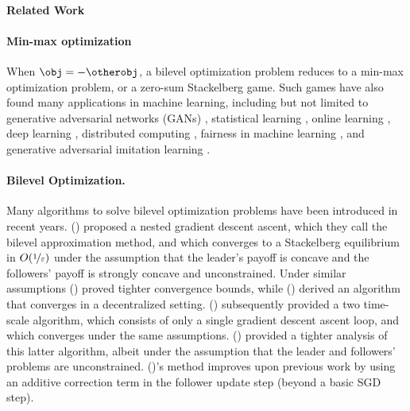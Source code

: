 \paragraph{Related Work}

\paragraph{Min-max optimization}
When $\obj = -\otherobj$, a bilevel optimization problem reduces to a min-max optimization problem, or a zero-sum Stackelberg game. 
Such games have also found many applications in machine learning, including but not limited to generative adversarial networks (GANs) \cite{goodfellow2014gan}, statistical learning \cite{xu2009robustness, shafieezadeh2015distributionally, dai2019kernel}, online learning \cite{cesa2006prediction}, deep learning \cite{sinha2017certifiable, sinha2020certifying}, distributed computing \cite{shamma2008cooperative, mateos2010distributed}, fairness in machine learning \cite{dai2019kernel, edwards2016censoring, madras2018learning, sattigeri2018fairness, xu2018fairgan}, and generative adversarial imitation learning \cite{cai2019global, hamedani2018iteration}.


\paragraph{Bilevel Optimization.} 
Many algorithms to solve bilevel optimization problems have been introduced in recent years.
\citeauthor{ghadimi2018approximation} (\citeyear{ghadimi2018approximation}) proposed a nested gradient descent ascent, which they call the bilevel approximation method, and which converges to a Stackelberg equilibrium in $O(\nicefrac{1}{\varepsilon})$ under the assumption that the leader's payoff is concave and the followers' payoff is strongly concave and unconstrained.
Under similar assumptions \citeauthor{ji2021bilevel} (\citeyear{ji2021bilevel}) proved tighter convergence bounds,
while \citeauthor{yang2021achieving} (\citeyear{yang2021achieving}) derived an
algorithm that converges  
in a decentralized setting.
\citeauthor{hong2020two} (\citeyear{hong2020two}) subsequently provided a two time-scale algorithm, which consists of only a single gradient descent ascent loop, and which converges  under the same assumptions.
\citeauthor{chen2021closing} (\citeyear{chen2021closing}) provided a tighter analysis of this latter algorithm, albeit under the assumption that the leader and followers' problems are unconstrained.
\citeauthor{chen2021closing} (\citeyear{chen2021closing})'s method improves upon previous work by using an additive correction term in the follower update step (beyond a basic SGD step).

